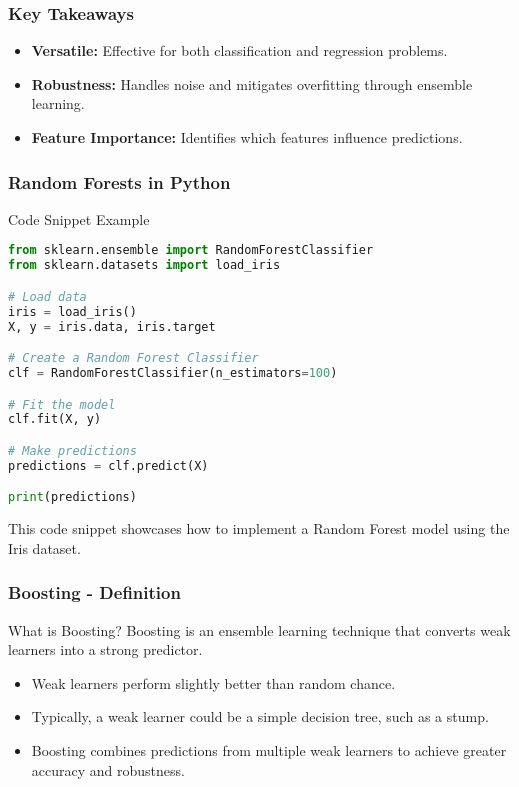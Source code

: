 \documentclass[aspectratio=169]{beamer}
\begin{document}
\begin{frame}[fragile]
    \frametitle{Key Takeaways}
    \begin{itemize}
        \item \textbf{Versatile:} Effective for both classification and regression problems.
        \item \textbf{Robustness:} Handles noise and mitigates overfitting through ensemble learning.
        \item \textbf{Feature Importance:} Identifies which features influence predictions.
    \end{itemize}
\end{frame}

\begin{frame}[fragile]
    \frametitle{Random Forests in Python}
    \begin{block}{Code Snippet Example}
        \begin{lstlisting}[language=Python]
from sklearn.ensemble import RandomForestClassifier
from sklearn.datasets import load_iris

# Load data
iris = load_iris()
X, y = iris.data, iris.target

# Create a Random Forest Classifier
clf = RandomForestClassifier(n_estimators=100)

# Fit the model
clf.fit(X, y)

# Make predictions
predictions = clf.predict(X)

print(predictions)
        \end{lstlisting}
    \end{block}
    This code snippet showcases how to implement a Random Forest model using the Iris dataset.
\end{frame}

\begin{frame}[fragile]
    \frametitle{Boosting - Definition}
    \begin{block}{What is Boosting?}
        Boosting is an ensemble learning technique that converts weak learners into a strong predictor.
    \end{block}
    
    \begin{itemize}
        \item Weak learners perform slightly better than random chance.
        \item Typically, a weak learner could be a simple decision tree, such as a stump.
        \item Boosting combines predictions from multiple weak learners to achieve greater accuracy and robustness.
    \end{itemize}
\end{frame}
\end{document}

